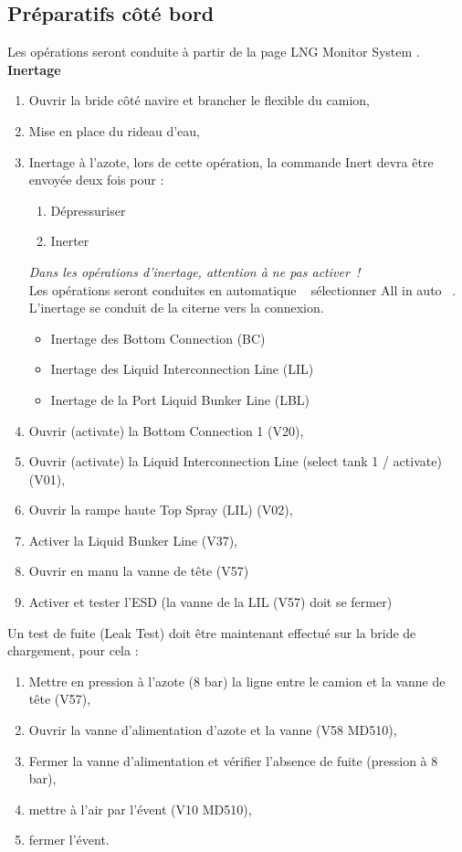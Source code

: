\documentclass[12pt,a4paper]{article}
\newcommand{\gui}[1]
{\og #1 \fg~}
\begin{document}
 \subsection*{Préparatifs côté bord}
Les opérations seront conduite à partir de la page \og LNG Monitor System \fg.
\\
\textbf{Inertage}
\begin{enumerate}
 \item Ouvrir la bride côté navire et brancher le flexible du camion,
 \item Mise en place du rideau d'eau,
 \item Inertage à l'azote, lors de cette opération, la commande Inert devra être envoyée deux fois pour :
 \begin{enumerate}
  \item Dépressuriser
  \item Inerter
 \end{enumerate}

    \emph{Dans les opérations d'inertage, attention à ne pas \og activer~\fg !}\\
Les opérations seront conduites en \gui{automatique} sélectionner \gui{All in auto}. L'inertage se conduit de la citerne vers la connexion.
    \begin{itemize}
        \item Inertage des Bottom Connection (BC)
        \item Inertage des Liquid Interconnection Line (LIL)
        \item Inertage de la Port Liquid Bunker Line (LBL)
    \end{itemize}
 \item Ouvrir (activate) la Bottom Connection 1 (V20),
 \item Ouvrir (activate) la Liquid Interconnection Line (select tank 1 / activate) (V01),
 \item Ouvrir la rampe haute Top Spray (LIL) (V02),
 \item Activer la Liquid Bunker Line (V37),
 \item Ouvrir en manu la vanne de tête (V57)
 \item Activer et tester l'ESD (la vanne de la LIL (V57)  doit se fermer)
\end{enumerate}
Un test de fuite (Leak Test) doit être maintenant effectué sur la bride de chargement, pour cela :\\
\begin{enumerate}
\item Mettre en pression à l'azote (8 bar) la ligne entre le camion et la vanne de tête (V57), 
 
 \item Ouvrir la vanne d'alimentation d'azote et la vanne (V58 MD510),
 \item Fermer la vanne d'alimentation et vérifier l'absence de fuite (pression à 8 bar),
 \item mettre à l'air par l'évent (V10 MD510),
 \item fermer l'évent.
\end{enumerate}
\end{document}
